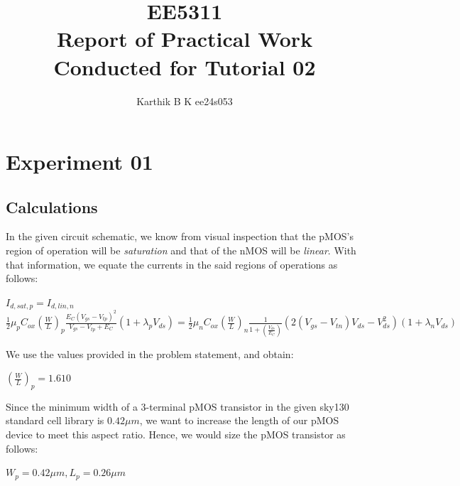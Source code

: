 \documentclass[10pt,letter]{article}
\begin{document}
\title{EE5311 \\ Report of Practical Work Conducted for Tutorial 02}
\author{Karthik B K ee24s053}
\maketitle

\section{Experiment 01}
\subsection{Calculations}
In the given circuit schematic, we know from visual inspection that the pMOS's region of operation will be \emph{saturation} and that of the nMOS will be \emph{linear}. With that information, we equate the currents in the said regions of operations as follows:

\begin{center}
    $I_{d,sat,p} = I_{d,lin,n}$ \\
    $\frac{1}{2}\mu_{p}C_{ox}(\frac{W}{L})_{p}\frac{E_{C}(V_{gs}-V_{tp})^{2}}{V_{gs}-V_{tp}+E_{C}}(1+\lambda_{p} V_{ds}) = \frac{1}{2}\mu_{n}C_{ox}(\frac{W}{L})_{n}\frac{1}{1+(\frac{V_{ds}}{E_{C}})}(2(V_{gs}-V_{tn})V_{ds}-V_{ds}^2)(1+\lambda_{n} V_{ds})$
\end{center}

We use the values provided in the problem statement, and obtain:

\begin{center}
    $(\frac{W}{L})_{p} = 1.610$
\end{center}

Since the minimum width of a 3-terminal pMOS transistor in the given sky130 standard cell library is $0.42 \mu m$, we want to increase the length of our pMOS device to meet this aspect ratio. Hence, we would size the pMOS transistor as follows:

\begin{center}
    $W_{p} = 0.42 \mu m, L_{p} = 0.26 \mu m$
\end{center}
\end{document}
